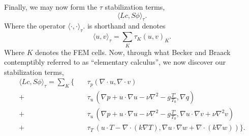 \documentclass{article}
\begin{document}
Finally, we may now form the $\tau$ stabilization terms, 
\begin{equation}
 \langle Lc,S\phi \rangle_\tau. 
\end{equation}
Where the operator $ \langle \cdot,\cdot \rangle_\tau. $ is shorthand 
and denotes
\begin{equation}
 \langle u,v \rangle_\tau = \sum_K \tau_K (u,v)_K.
\end{equation}
Where $K$ denotes the FEM cells. Now, through what Becker and Braack
contemptibly referred to as ``elementary calculus'', we now discover our
stabilization terms,  
\begin{align*}
 \langle Lc,S\phi \rangle_\tau = \sum_K \{ \quad &\tau_p (\nabla \cdot u,
 \nabla \cdot v) \\
 +\quad &\tau_u \,(\nabla p + u \cdot \nabla u - \nu \nabla^2 - g \frac{T'}{T_0},
 \nabla q) \\
 +\quad &\tau_u \, (\nabla p + u \cdot \nabla u - \nu \nabla^2 - g \frac{T'}{T_0},
 \nabla u \cdot \nabla v + \nu \nabla^2 v) \\
 +\quad &\tau_T \, (u \cdot T - \nabla \cdot (k \nabla T), \nabla u \cdot \nabla
 w + \nabla \cdot (k \nabla w)) \}.
\end{align*}
\end{document}
